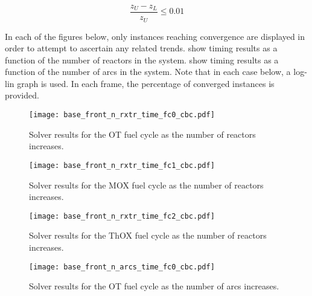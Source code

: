 \begin{equation}\label{eqn:ratio_gap}
\frac{z_U - z_L}{z_U} \leq 0.01
\end{equation}

In each of the figures below, only instances reaching convergence are displayed
in order to attempt to ascertain any related
trends. 
show timing results as a function of the number of reactors in the
system. 
show timing results as a function of the number of arcs in the system. Note that
in each case below, a log-lin graph is used. In each frame, the percentage of
converged instances is provided.

\begin{figure}[h!]
  \begin{center}
    \texttt{[image: base\_front\_n\_rxtr\_time\_fc0\_cbc.pdf]}
    \caption{
      \label{fig:base_front_n_rxtr_time_fc0_cbc}
      \cbc Solver results for the OT fuel cycle as the number of reactors
      increases.
      }
  \end{center}
\end{figure}

\begin{figure}[h!]
  \begin{center}
    \texttt{[image: base\_front\_n\_rxtr\_time\_fc1\_cbc.pdf]}
    \caption{
      \label{fig:base_front_n_rxtr_time_fc1_cbc}
      \cbc Solver results for the MOX fuel cycle as the number of reactors
      increases.
      }
  \end{center}
\end{figure}

\begin{figure}[h!]
  \begin{center}
    \texttt{[image: base\_front\_n\_rxtr\_time\_fc2\_cbc.pdf]}
    \caption{
      \label{fig:base_front_n_rxtr_time_fc2_cbc}
      \cbc Solver results for the ThOX fuel cycle as the number of reactors
      increases.
      }
  \end{center}
\end{figure}

\begin{figure}[h!]
  \begin{center}
    \texttt{[image: base\_front\_n\_arcs\_time\_fc0\_cbc.pdf]}
    \caption{
      \label{fig:base_front_n_arcs_time_fc0_cbc}
      \cbc Solver results for the OT fuel cycle as the number of arcs
      increases.
      }
  \end{center}
\end{figure}

